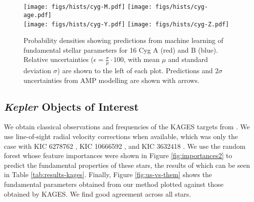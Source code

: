 \documentclass[manuscript]{aastex}
\begin{document}
\begin{figure*}
    \centering
    \texttt{[image: figs/hists/cyg-M.pdf]}\hfill
    \texttt{[image: figs/hists/cyg-age.pdf]}\\
    \texttt{[image: figs/hists/cyg-Y.pdf]}\hfill
    \texttt{[image: figs/hists/cyg-Z.pdf]}
    
    \caption{Probability densities showing predictions from machine learning of fundamental stellar parameters for 16 Cyg A (red) and B (blue). Relative uncertainties ($\epsilon = \frac{\sigma}{\mu}\cdot 100$, with mean $\mu$ and standard deviation $\sigma$) are shown to the left of each plot. %
    Predictions and $2\sigma$ uncertainties from AMP modelling are shown with arrows.}
    \label{fig:16Cyg-hist}
\end{figure*}


\subsection{\emph{Kepler} Objects of Interest}
We obtain classical observations and frequencies of the KAGES targets from \citet{2015MNRAS.452.2127S}. We use line-of-sight radial velocity corrections when available, which was only the case with KIC 6278762 \citep{2002AJ....124.1144L}, KIC 10666592 \citep{2013A&A...554A..84M}, and KIC 3632418 \citep{2006AstL...32..759G}. We use the random forest whose feature importances were shown in Figure \ref{fig:importances2} to predict the fundamental properties of these stars, the results of which can be seen in Table \ref{tab:results-kages}. Finally, Figure \ref{fig:us-vs-them} shows the fundamental parameters obtained from our method plotted against those obtained by KAGES. We find good agreement across all stars.
\end{document}
